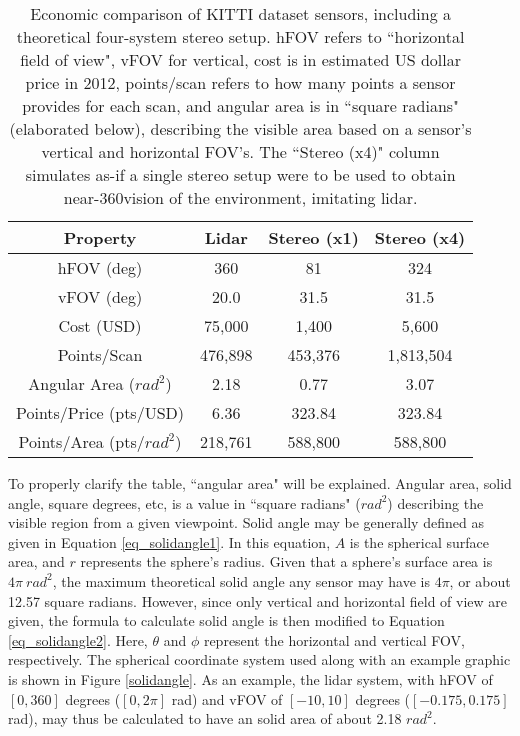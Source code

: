 \def \b #1{\textbf{#1}} %
\begin{table}[ht]
	\centering
	\caption{Economic comparison of KITTI dataset sensors, including a theoretical four-system stereo setup. hFOV refers to ``horizontal field of view", vFOV for vertical, cost is in estimated US dollar price in 2012, points/scan refers to how many points a sensor provides for each scan, and angular area is in ``square radians" (elaborated below), describing the visible area based on a sensor's vertical and horizontal FOV's. The ``Stereo (x4)" column simulates as-if a single stereo setup were to be used to obtain near-360\deg vision of the environment, imitating lidar.}
	\begin{tabular}{|c|c|c|c|}
	\hline
	\b{Property}              & \b{Lidar} & \b{Stereo (x1)} & \b{Stereo (x4)} \\ \hline
	hFOV (deg)                & 360       & 81              & 324       \\\hline
	vFOV (deg)                & 20.0      & 31.5            & 31.5      \\\hline
	Cost (USD)                & 75,000    & 1,400           & 5,600     \\\hline
	Points/Scan               & 476,898   & 453,376         & 1,813,504 \\\hline
	Angular Area ($rad^2$)    & 2.18      & 0.77            & 3.07      \\\hline
	Points/Price (pts/USD)    & 6.36      & 323.84          & 323.84    \\\hline
	Points/Area (pts/$rad^2$) & 218,761   & 588,800         & 588,800   \\\hline
	\end{tabular}
	\label{economics_table}
\end{table}


To properly clarify the table, ``angular area" will be explained. Angular area, solid angle, square degrees, etc, is a value in ``square radians" ($rad^2$) describing the visible region from a given viewpoint. Solid angle may be generally defined as given in Equation \ref{eq_solidangle1}. In this equation, $A$ is the spherical surface area, and $r$ represents the sphere's radius. Given that a sphere's surface area is $4\pi \ rad^2$, the maximum theoretical solid angle any sensor may have is $4\pi$, or about 12.57 square radians. However, since only vertical and horizontal field of view are given, the formula to calculate solid angle is then modified to Equation \ref{eq_solidangle2}. Here, $\theta$ and $\phi$ represent the horizontal and vertical FOV, respectively. The spherical coordinate system used along with an example graphic is shown in Figure \ref{solidangle}. As an example, the lidar system, with hFOV of $[0,360]$ degrees ($[0,2\pi]$ rad) and vFOV of $[-10,10]$ degrees ($[-0.175,0.175]$ rad), may thus be calculated to have an solid area of about 2.18 ${rad}^2$. 

